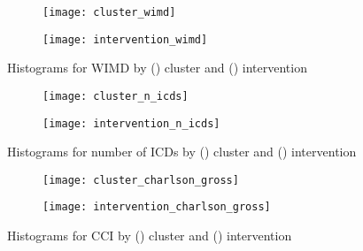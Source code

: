 \begin{figure}
    \centering
    \begin{subfigure}{\halfimgwidth}
        \texttt{[image: cluster\_wimd]}
        \caption{}\label{fig:cluster_wimd}
    \end{subfigure}\hfill%
    \begin{subfigure}{\halfimgwidth}
        \texttt{[image: intervention\_wimd]}
        \caption{}\label{fig:intervention_wimd}
    \end{subfigure}
    \caption{%
        Histograms for WIMD by () cluster and
        () intervention
    }\label{fig:wimd_hist}
\end{figure}

\begin{figure}
    \centering
    \begin{subfigure}{\halfimgwidth}
        \texttt{[image: cluster\_n\_icds]}
        \caption{}\label{fig:cluster_n_icds}
    \end{subfigure}\hfill%
    \begin{subfigure}{\halfimgwidth}
        \texttt{[image: intervention\_n\_icds]}
        \caption{}\label{fig:intervention_n_icds}
    \end{subfigure}
    \caption{%
        Histograms for number of ICDs by () cluster
        and () intervention
    }\label{fig:n_icds_hist}
\end{figure}

\begin{figure}
    \centering
    \begin{subfigure}{\halfimgwidth}
        \texttt{[image: cluster\_charlson\_gross]}
        \caption{}\label{fig:cluster_charlson}
    \end{subfigure}\hfill%
    \begin{subfigure}{\halfimgwidth}
        \texttt{[image: intervention\_charlson\_gross]}
        \caption{}\label{fig:intervention_charlson}
    \end{subfigure}
    \caption{%
        Histograms for CCI by () cluster and
        () intervention
    }\label{fig:charlson_hist}
\end{figure}


